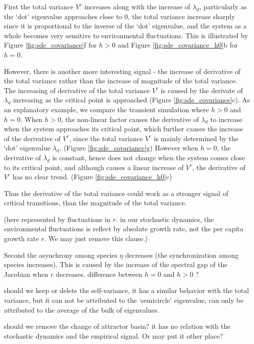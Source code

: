 \documentclass[a4paper,fleqn,12pt]{article}
\begin{document}
First the total variance $V^c$ increases along with the increase of $\lambda_d$, particularly as the `dot' eigenvalue approaches close to 0, the total variance increase sharply since it is proportional to the inverse of the `dot' eigenvalue, and the system as a whole becomes very sensitive to environmental fluctuations.
This is illustrated by Figure \ref{fig:sde_covariance}f for $h>0$ and Figure \ref{fig:sde_covariance_h0}b for $h = 0$.

However, there is another more interesting signal - 
the increase of derivative of the total variance rather than the increase of magnitude of the total variance.
The increasing of derivative of the total variance $V^c$ is caused by the derivate of $\lambda_d$ increasing as the critical point is approached (Figure \ref{fig:sde_covariance}c).
As an explanatory example, we compare the transient simulation where $h > 0$ and $h = 0$.
When $h > 0$, the non-linear factor causes the derivative of $\lambda_d$ to increase when the system approaches its critical point,
which further causes the increase of the derivative of $V^c$,
since the total variance $V^c$ is mainly determined by the `dot' eigenvalue $\lambda_d$.
(Figure \ref{fig:sde_covariance}g)
However when $h = 0$, the derivative of $\lambda_d$ is constant, hence does not change when the system comes close to its critical point,
and although causes a linear increase of $V^c$,
the derivative of $V^c$ has no clear trend.
(Figure \ref{fig:sde_covariance_h0}c)

Thus the derivative of the total variance could work as a stronger signal of critical transitions, than the magnitude of the total variance.


{\color{red}(here represented by fluctuations in $r$. in our stochastic dynamics, the environmental fluctuations is reflect by absolute growth rate, not the per capita growth rate $r$. We may just remove this clause.)}


Second the asynchrony among species $\eta$ decreases (the synchronization among species increases). This is caused by the increase of the spectral gap of the Jacobian when $r$ decreases. {\color{red}difference between $h=0$ and $h>0$ ?}

{\color{red} should we keep or delete the self-variance, it has a similar behavior with the total variance, but it can not be attributed to the `semicircle' eigenvalue, can only be attributed to the average of the bulk of eigenvalues.}

{\color{red} should we remove the change of attractor basin? it has no relation with the stochastic dynamics and the empirical signal. Or may put it other place?}
\end{document}
